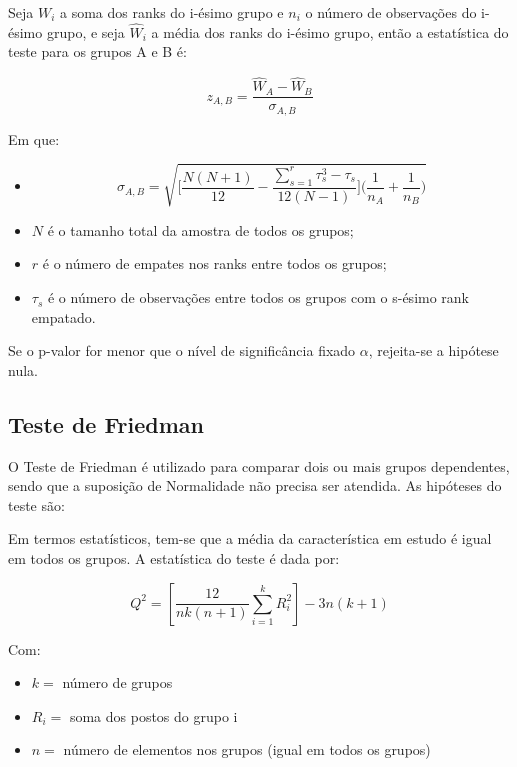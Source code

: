 \documentclass[
  portuguese,
]{estat/estat}
\providecommand{\tightlist}{%
  \setlength{\itemsep}{0pt}\setlength{\parskip}{0pt}}
\begin{document}

Seja \(W_i\) a soma dos ranks do i-ésimo grupo e \(n_i\) o número de
observações do i-ésimo grupo, e seja \(\hat{W}_i\) a média dos ranks do
i-ésimo grupo, então a estatística do teste para os grupos A e B é:

\[z_{A,B} = \frac{\hat{W}_A - \hat{W}_B}{\sigma_{A,B}} \]

Em que:

\begin{itemize}
\tightlist
\item
  \[\sigma_{A,B} = \sqrt{\Bigg[\frac{N(N+1)}{12}-\frac{\sum^r_{s=1}\tau_s^3-\tau_s}{12(N-1)}\Bigg]\Bigg(\frac{1}{n_A}+\frac{1}{n_B}\Bigg)}\]
\item
  \(N\) é o tamanho total da amostra de todos os grupos;
\item
  \(r\) é o número de empates nos ranks entre todos os grupos;
\item
  \(\tau_s\) é o número de observações entre todos os grupos com o
  s-ésimo rank empatado.
\end{itemize}

Se o p-valor for menor que o nível de significância fixado \(\alpha\),
rejeita-se a hipótese nula.

\subsection{Teste de Friedman}\label{teste-de-friedman}

O Teste de Friedman é utilizado para comparar dois ou mais grupos
dependentes, sendo que a suposição de Normalidade não precisa ser
atendida. As hipóteses do teste são:


Em termos estatísticos, tem-se que a média da característica em estudo é
igual em todos os grupos. A estatística do teste é dada por:

\[Q^2=\left[\frac{12}{nk(n+1)} \sum_{i=1}^k R_i^2\right] - 3n(k+1)\]

Com:

\begin{itemize}
\tightlist
\item
  \(k=\) número de grupos
\item
  \(R_i=\) soma dos postos do grupo i
\item
  \(n=\) número de elementos nos grupos (igual em todos os grupos)
\end{itemize}
\end{document}
